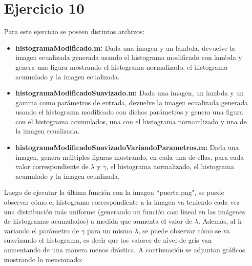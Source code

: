 \documentclass{article}
\begin{document}
\section*{Ejercicio 10}
Para este ejercicio se poseen distintos archivos:
\begin{itemize}
\item \textbf{histogramaModificado.m: }Dada una imagen y un lambda, devuelve la imagen ecualizada generada usando el histograma modificado con lambda y genera una figura mostrando el histograma normalizado, el histograma acumulado y la imagen ecualizada.
\item \textbf{histogramaModificadoSuavizado.m: }Dada una imagen, un lambda y un gamma como parámetros de entrada, devuelve la imagen ecualizada generada usando el histograma modificado con dichos parámetros y genera una figura con el histograma acumulados, una con el histograma nornamlizado y una de la imagen ecualizada.  
\item \textbf{histogramaModificadoSuavizadoVariandoParametros.m: }Dada una imagen, genera múltiples figuras mostrando, en cada una de ellas, para cada valor correspondiente de $\lambda$ y $\gamma$, el histograma normalizado, el histograma acumulado y la imagen ecualizada.
\end{itemize}
Luego de ejecutar la última función con la imagen ``puerta.png", se puede observar cómo el histograma correspondiente a la imagen va teniendo cada vez una distribución más uniforme (generando un función casi lineal en las imágenes de histogramas acumulados) a medida que aumenta el valor de $\lambda$. Además, al ir variando el parámetro de $\gamma$ para un mismo $\lambda$, se puede observar cómo se va suavizando el histograma, es decir que los valores de nivel de gris van aumentando de una manera menos drástica. A continuación se adjuntan gráficos mostrando lo mencionado:
\end{document}
